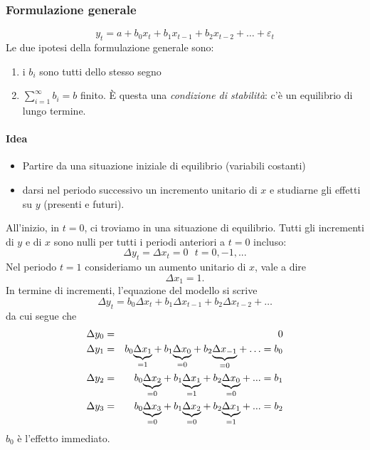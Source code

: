 \documentclass[a4paper]{report}
\newcounter{ese}
\theoremstyle{remark}
\begin{document}
\subsubsection{Formulazione generale}

\begin{equation*}
y_{t}=a+b_{0}x_{t}+b_{1}x_{t-1}+b_{2}x_{t-2}+\ldots +\varepsilon _{t}
\end{equation*}%
Le due ipotesi della formulazione generale sono:

\begin{enumerate}
\item i $b_{i}$ sono tutti dello stesso segno

\item $\sum_{i=1}^{\infty }b_{i}=b$ finito. \`{E} questa una \emph{%
condizione di stabilit\`{a}}: c'\`{e} un equilibrio di lungo termine.
\end{enumerate}

\paragraph{Idea}

\begin{itemize}
\item Partire da una situazione iniziale di equilibrio (variabili costanti)

\item darsi nel periodo successivo un incremento unitario di $x$ e studiarne
gli effetti su $y$ (presenti e futuri).
\end{itemize}

\noindent All'inizio, in $t=0$, ci troviamo in una situazione di equilibrio.
Tutti gli incrementi di $y$ e di $x$ sono nulli per tutti i periodi
anteriori a $t=0$ incluso:%
\begin{equation*}
\Delta y_{t}=\Delta x_{t}=0\text{ \ \ }t=0,-1,...
\end{equation*}%
Nel periodo $t=1$ consideriamo un aumento unitario di $x$, vale a dire%
\begin{equation*}
\Delta x_{1}=1.
\end{equation*}%
In termine di incrementi, l'equazione del modello si scrive%
\begin{equation*}
\Delta y_{t}=b_{0}\Delta x_{t}+b_{1}\Delta x_{t-1}+b_{2}\Delta x_{t-2}+\ldots
\end{equation*}%
da cui segue che%
\begin{eqnarray*}
\Delta y_{0} &=&0 \\
\Delta y_{1} &=&b_{0}\underset{=1}{\underbrace{\Delta x_{1}}}+b_{1}\underset{%
=0}{\underbrace{\Delta x_{0}}}+b_{2}\underset{=0}{\underbrace{\Delta x_{-1}}}%
+\ldots =b_{0} \\
\Delta y_{2} &=&b_{0}\underset{=0}{\underbrace{\Delta x_{2}}}+b_{1}\underset{%
=1}{\underbrace{\Delta x_{1}}}+b_{2}\underset{=0}{\underbrace{\Delta x_{0}}}%
+...=b_{1} \\
\Delta y_{3} &=&b_{0}\underset{=0}{\underbrace{\Delta x_{3}}}+b_{1}\underset{%
=0}{\underbrace{\Delta x_{2}}}+b_{2}\underset{=1}{\underbrace{\Delta x_{1}}}%
+...=b_{2}
\end{eqnarray*}%
$b_{0}$ \`{e} l'effetto immediato.
\end{document}
